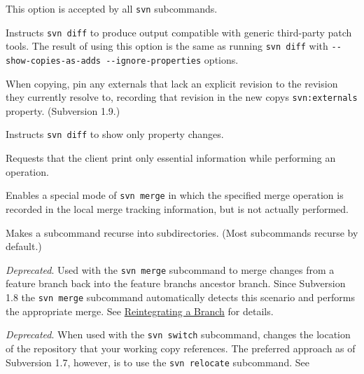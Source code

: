 \begin{description}
This option is accepted by all \texttt{svn} subcommands.
\item[\protect\phantomsection\label{svn.ref.svn.sw.patch_compatible}{}\texttt{-\/-patch-compatible}]
Instructs \texttt{svn\ diff} to produce output compatible with generic
third-party patch tools. The result of using this option is the same as
running \texttt{svn\ diff} with
\texttt{-\/-show-copies-as-adds\ -\/-ignore-properties} options.
\item[\protect\phantomsection\label{svn.ref.svn.sw.pin_externals}{}\texttt{-\/-pin-externals}]
When copying, pin any externals that lack an explicit revision to the
revision they currently resolve to, recording that revision in the new
copy\textquotesingle s \texttt{svn:externals} property. (Subversion 1.9.)
\item[\protect\phantomsection\label{svn.ref.svn.sw.properties_only}{}\texttt{-\/-properties-only}]
Instructs \texttt{svn\ diff} to show only property changes.
\item[\protect\phantomsection\label{svn.ref.svn.sw.quiet}{}\texttt{-\/-quiet}
(\texttt{-q})]
Requests that the client print only essential information while
performing an operation.
\item[\protect\phantomsection\label{svn.ref.svn.sw.record_only}{}\texttt{-\/-record-only}]
Enables a special mode of \texttt{svn\ merge} in which the specified
merge operation is recorded in the local merge tracking information, but
is not actually performed.
\item[\protect\phantomsection\label{svn.ref.svn.sw.recursive}{}\texttt{-\/-recursive}
(\texttt{-R})]
Makes a subcommand recurse into subdirectories. (Most subcommands
recurse by default.)
\item[\protect\phantomsection\label{svn.ref.svn.sw.reintegrate}{}\texttt{-\/-reintegrate}]
\emph{Deprecated}. Used with the \texttt{svn\ merge} subcommand to merge
changes from a feature branch back into the feature
branch\textquotesingle s ancestor branch. Since Subversion 1.8 the
\texttt{svn\ merge} subcommand automatically detects this scenario and
performs the appropriate merge. See
\hyperref[svn.branchmerge.basicmerging.reintegrate]{Reintegrating a
Branch} for details.
\item[\protect\phantomsection\label{svn.ref.svn.sw.relocate}{}\texttt{-\/-relocate}]
\emph{Deprecated}. When used with the \texttt{svn\ switch} subcommand,
changes the location of the repository that your working copy
references. The preferred approach as of Subversion 1.7, however, is to
use the \texttt{svn\ relocate} subcommand. See

\end{description}

